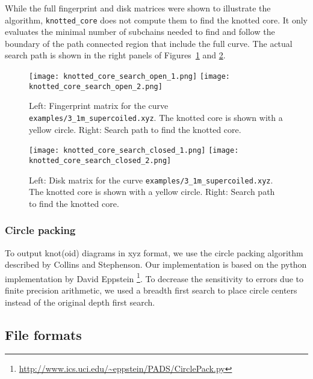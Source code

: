 While the full fingerprint and disk matrices were shown to illustrate the algorithm, \lstinline{knotted_core} does not compute them to find the knotted core. It only evaluates the minimal number of subchains needed to find and follow the boundary of the path connected region that include the full curve. The actual search path is shown in the right panels of Figures~\ref{fig:algorithm:knottedcore:open} and \ref{fig:algorithm:knottedcore:closed}.
\begin{figure}[t]
\centering
\texttt{[image: knotted\_core\_search\_open\_1.png]}
\texttt{[image: knotted\_core\_search\_open\_2.png]}
\caption{Left: Fingerprint matrix for the curve \lstinline{examples/3_1m_supercoiled.xyz}. The knotted core is shown with a yellow circle. Right: Search path to find the knotted core.}\label{fig:algorithm:knottedcore:open}
\end{figure}
\begin{figure}[t]
\centering
\texttt{[image: knotted\_core\_search\_closed\_1.png]}
\texttt{[image: knotted\_core\_search\_closed\_2.png]}
\caption{Left: Disk matrix for the curve \lstinline{examples/3_1m_supercoiled.xyz}. The knotted core is shown with a yellow circle. Right: Search path to find the knotted core.}\label{fig:algorithm:knottedcore:closed}
\end{figure}

\subsubsection{\label{sec:algorithms:circlepacking}Circle packing}
To output knot(oid) diagrams in xyz format, we use the circle packing algorithm described by Collins and Stephenson\cite{Collins2003}.
Our implementation is based on the python implementation by David Eppstein \footnote{\url{http://www.ics.uci.edu/~eppstein/PADS/CirclePack.py}}. To decrease the sensitivity to errors due to finite precision arithmetic, we used a breadth first search to place circle centers instead of the original depth first search.


\subsection{File formats}
